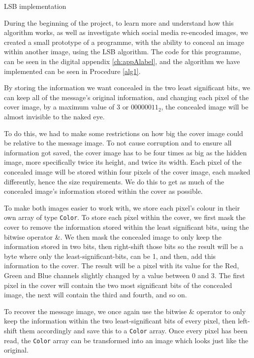 \begin{experiment}{LSB implementation}

\label{sec:lsb-implementation}
During the beginning of the project, to learn more and understand how this algorithm works, as well as investigate which social media re-encoded images, we created a small prototype of a programme, with the ability to conceal an image within another image, using the LSB algorithm. The code for this programme, can be seen in the digital appendix \ref{ch:appAlabel}, and the algorithm we have implemented can be seen in Procedure \ref{alg1}.

By storing the information we want concealed in the two least significant bits, we can keep all of the message's original information, and changing each pixel of the cover image, by a maximum value of 3 or $00000011_2$, the concealed image will be almost invisible to the naked eye.

To do this, we had to make some restrictions on how big the cover image could be relative to the message image. 
To not cause corruption and to ensure all information got saved, the cover image has to be four times as big as the hidden image, more specifically twice its height, and twice its width. 
Each pixel of the concealed image will be stored within four pixels of the cover image, each masked differently, hence the size requirements. 
We do this to get as much of the concealed image's information stored within the cover as possible.

To make both images easier to work with, we store each pixel's colour in their own array of type \lstinline|Color|.
To store each pixel within the cover, we first mask the cover to remove the information stored within the least significant bits, using the bitwise operator \&.
We then mask the concealed image to only keep the information stored in two bits, then right-shift those bits so the result will be a byte where only the least-significant-bits, can be 1, and then, add this information to the cover. 
The result will be a pixel with its value for the Red, Green and Blue channels slightly changed by a value between 0 and 3.
The first pixel in the cover will contain the two most significant bits of the concealed image, the next will contain the third and fourth, and so on. 

To recover the message image, we once again use the bitwise \& operator to only keep the information within the two least-significant bits of every pixel, then left-shift them accordingly and save this to a \lstinline|Color| array. Once every pixel has been read, the \lstinline|Color| array can be transformed into an image which looks just like the original.


\end{experiment}
